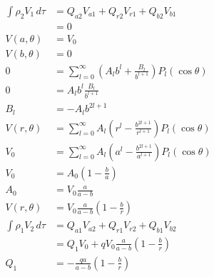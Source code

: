 \documentclass{article}
\begin{document}
\begin{enumerate}
        \begin{align*}
          \int \rho_2 V_1 \,d \tau & = Q_{a 2} V_{a 1} + Q_{r 2} V_{r 1} + Q_{b 2} V_{b 1}                                          \\
                                   & = 0                                                                                            \\
          V(a, \theta)             & = V_0                                                                                          \\
          V(b, \theta)             & = 0                                                                                            \\
          0                        & = \sum_{l = 0}^\infty \left( A_l b^l + \frac{B_l}{b^{l + 1}} \right) P_l (\cos \theta)         \\
          0                        & = A_l b^l \frac{B_l}{b^{l + 1}}                                                                \\
          B_l                      & = -A_l b^{2 l + 1}                                                                             \\
          V(r, \theta)             & = \sum_{l = 0}^\infty A_l \left( r^l - \frac{b^{2 l + 1}}{r^{l + 1}} \right) P_l (\cos \theta) \\
          V_0                      & = \sum_{l = 0}^\infty A_l \left( a^l - \frac{b^{2 l + 1}}{a^{l + 1}} \right) P_l (\cos \theta) \\
          V_0                      & = A_0 \left( 1 - \frac{b}{a} \right)                                                           \\
          A_0                      & = V_0 \frac{a}{a - b}                                                                          \\
          V(r, \theta)             & = V_0 \frac{a}{a - b} \left( 1 - \frac{b}{r} \right)                                           \\
          \int \rho_1 V_2 \,d \tau & = Q_{a 1} V_{a 2} + Q_{r 1} V_{r 2} + Q_{b 1} V_{b 2}                                          \\
                                   & = Q_1 V_0 + q V_0 \frac{a}{a - b} \left( 1 - \frac{b}{r} \right)                               \\
          Q_1                      & = -\frac{q a}{a - b} \left( 1 - \frac{b}{r} \right)
        \end{align*}
\end{enumerate}
\end{document}
